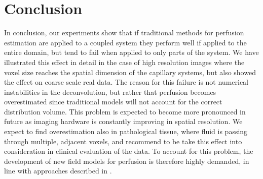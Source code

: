 \documentclass[journal,twocolumn]{IEEEtran}
\begin{document}
	\section{Conclusion}
	In conclusion, our experiments show that if traditional methods for perfusion estimation are applied to a coupled system they perform well if applied to the entire domain, but tend to fail when applied to only parts of the system. 
	We have illustrated this effect in detail in the case of high resolution images where the voxel size reaches the spatial dimension of the capillary systems, but also showed the effect on coarse scale real data.
		The reason for this failure is not numerical instabilities in the deconvolution, but rather that perfusion becomes overestimated since traditional models will not account for the correct distribution volume.
  	This problem is expected to become more pronounced in future as imaging hardware is constantly improving in spatial resolution.
	We expect to find overestimation also in pathological tissue, where fluid is passing through multiple, adjacent voxels, and recommend to be take this effect into consideration in clinical evaluation of the data. To account for this problem, the development of new field models for perfusion is therefore highly demanded, in line with approaches described in \cite{sourbron14,Michler2013}. 	
	

	
		
	
	
\end{document}
